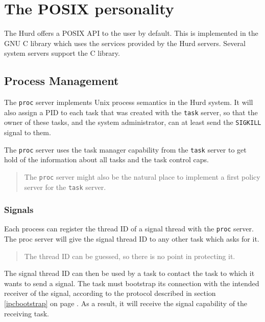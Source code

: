 \documentclass[9pt,a4paper]{extarticle}
\newenvironment{comment}{\footnotesize \begin{quote}}{\end{quote}}
\begin{document}
\section{The POSIX personality}

The Hurd offers a POSIX API to the user by default.  This is
implemented in the GNU C library which uses the services provided by
the Hurd servers.  Several system servers support the C library.


\subsection{Process Management}
\label{proc}

The \texttt{proc} server implements Unix process semantics in the Hurd
system.  It will also assign a PID to each task that was created with
the \texttt{task} server, so that the owner of these tasks, and the
system administrator, can at least send the \verb/SIGKILL/ signal to
them.

The \texttt{proc} server uses the task manager capability from the
\texttt{task} server to get hold of the information about all tasks
and the task control caps.

\begin{comment}
  The \texttt{proc} server might also be the natural place to
  implement a first policy server for the \texttt{task} server.
\end{comment}


\subsubsection{Signals}
\label{signals}

Each process can register the thread ID of a signal thread with the
\texttt{proc} server.  The proc server will give the signal thread ID
to any other task which asks for it.

\begin{comment}
  The thread ID can be guessed, so there is no point in protecting it.
\end{comment}

The signal thread ID can then be used by a task to contact the task to
which it wants to send a signal.  The task must bootstrap its
connection with the intended receiver of the signal, according to the
protocol described in section \ref{ipcbootstrap} on page
\pageref{ipcbootstrap}.  As a result, it will receive the signal
capability of the receiving task.
\end{document}
